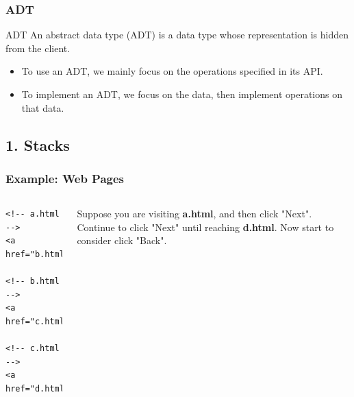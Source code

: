 \documentclass[aspectratio=169, 14pt]{beamer}
\begin{document}
\begin{frame}
	\frametitle{ADT}
	\begin{exampleblock}{ADT}
		An abstract data type (ADT) is a data type whose representation is hidden from the client.
	\end{exampleblock}
	\begin{itemize}
		\item To use an ADT, we mainly focus on the operations specified in its \alert{API}.
		\item To implement an ADT, we focus on the data, then implement operations on that data.
	\end{itemize}
\end{frame}
{
\begin{frame}
	\section{\textcolor{darkmidnightblue}{1. Stacks}}
\end{frame}
}

\begin{frame}[fragile]
	\frametitle{Example: Web Pages}

	\begin{columns}
		\begin{verbatim}
<!-- a.html -->
<a href="b.html">Next</a>

<!-- b.html -->
<a href="c.html">Next</a>

<!-- c.html -->
<a href="d.html">Next</a>
        \end{verbatim}
		Suppose you are visiting \textbf{a.html}, and then click "Next". Continue to click "Next" until reaching \textbf{d.html}. Now start to consider click "Back".
	\end{columns}

\end{frame}
\end{document}
